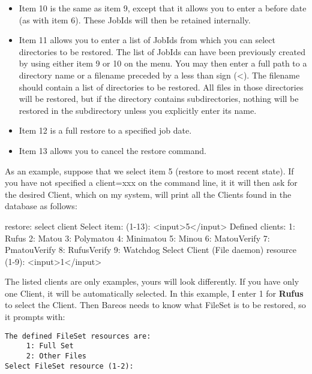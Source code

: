 \begin{itemize}
\item Item 10 is the same as item 9, except that it allows you to enter
   a before date (as with item 6). These JobIds will then be retained
   internally.

\item Item 11 allows you to enter a list of JobIds from which you can
   select directories to be restored. The list of JobIds can have been
   previously created by using either item 9 or 10 on the menu.  You
   may then enter a full path to a directory name or a filename preceded
   by a less than sign ({\textless}). The filename should contain a list
   of directories to be restored.  All files in those directories will
   be restored, but if the directory contains subdirectories, nothing
   will be restored in the subdirectory unless you explicitly enter its
   name.

\item Item 12 is a full restore to a specified job date.

\item Item 13 allows you to cancel the restore command.
\end{itemize}

As an example, suppose that we select item 5 (restore to most recent state).
If you have not specified a client=xxx on the command line, it
it will then ask for the desired Client, which on my system, will print all
the Clients found in the database as follows:

\begin{bconsole}{restore: select client}
Select item:  (1-13): <input>5</input>
Defined clients:
     1: Rufus
     2: Matou
     3: Polymatou
     4: Minimatou
     5: Minou
     6: MatouVerify
     7: PmatouVerify
     8: RufusVerify
     9: Watchdog
Select Client (File daemon) resource (1-9): <input>1</input>
\end{bconsole}

The listed clients are only examples, yours will look differently.
If you have only one Client, it will be automatically selected.
In this example, I enter 1 for
{\bf Rufus} to select the Client.
Then Bareos needs to know what FileSet is
to be restored, so it prompts with:

\footnotesize
\begin{verbatim}
The defined FileSet resources are:
     1: Full Set
     2: Other Files
Select FileSet resource (1-2):
\end{verbatim}
\normalsize

